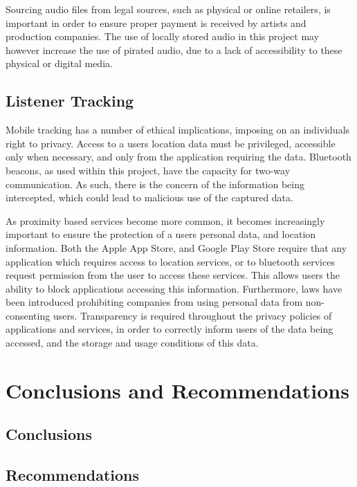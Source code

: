 \documentclass[11pt,a4paper,headinclude=false,footinclude=false]{scrreprt}
\begin{document}
Sourcing audio files from legal sources, such as physical or online
retailers, is important in order to ensure proper payment is received by
artists and production companies. The use of locally stored audio in
this project may however increase the use of pirated audio, due to a
lack of accessibility to these physical or digital media.

\section{Listener Tracking}\label{listener-tracking-3}

Mobile tracking has a number of ethical implications, imposing on an
individuals right to privacy. Access to a users location data must be
privileged, accessible only when necessary, and only from the
application requiring the data. Bluetooth beacons, as used within this
project, have the capacity for two-way communication. As such, there is
the concern of the information being intercepted, which could lead to
malicious use of the captured data\cite{bleprivacy}.

As proximity based services become more common, it becomes increasingly
important to ensure the protection of a users personal data, and
location information. Both the Apple App Store, and Google Play Store
require that any application which requires access to location services,
or to bluetooth services request permission from the user to access
these services. This allows users the ability to block applications
accessing this information. Furthermore, laws have been introduced
prohibiting companies from using personal data from non-consenting
users\cite{proxmarketing}. Transparency is required throughout the
privacy policies of applications and services, in order to correctly
inform users of the data being accessed, and the storage and usage
conditions of this data.

\chapter{Conclusions and
Recommendations}\label{conclusions-and-recommendations}

\section{Conclusions}\label{conclusions}

\section{Recommendations}\label{recommendations}
\end{document}
